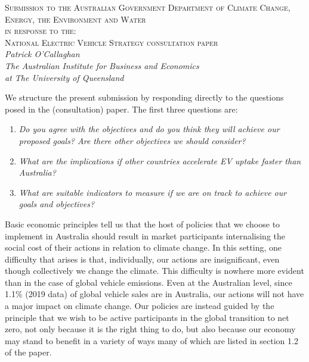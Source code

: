 \documentclass[12pt, draft]{article} \usepackage[shortlabels]{enumitem}
\begin{document}
\begin{centering}
  \textsc{Submission to the Australian Government Department of Climate Change,
  Energy, the Environment and Water\\ in response to the:\\
  National Electric Vehicle Strategy consultation paper}\\
\vskip10pt
  \emph{Patrick O'Callaghan\\
  The Australian Institute for Business and Economics\\
  at The University of Queensland}\\
\end{centering}
\vskip20pt

We structure the present submission by responding directly to the
questions posed in the (consultation) paper. The first three questions are: 

\begin{enumerate}
 
  \item \emph{Do you agree with the objectives and do you think
      they will achieve our proposed goals? Are there other objectives we
      should consider?}

  \item \emph{What are the implications if other countries accelerate EV
    uptake faster than Australia?}

  \item \emph{What are suitable indicators to measure if we are on track to
    achieve our goals and objectives?}

\end{enumerate}

Basic economic principles tell us that the host of policies that we choose to
implement in Australia should result in market participants internalising the
social cost of their actions in relation to climate change. In this setting,
one difficulty that arises is that, individually, our actions are
insignificant, even though collectively we change the climate.  This difficulty
is nowhere more evident than in the case of global vehicle emissions.  Even at
the Australian level, since 1.1\% (2019 data) of global vehicle sales are in
Australia, our actions will not have a major impact on climate change. Our
policies are instead guided by the principle that we wish to be active
participants in the global transition to net zero, not only because it is the
right thing to do, but also because our economy may stand to benefit in a
variety of ways many of which are listed in section 1.2 of the paper.
\end{document}
